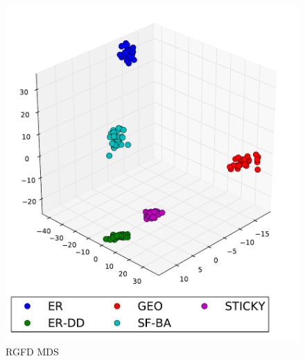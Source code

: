 \documentclass[11pt,xcolor=table]{beamer}
\begin{document}
\begin{frame}
\begin{figure}[H]
\begin{minipage}[b]{0.50\linewidth}
    \includegraphics[scale=0.30]
    {../code/final_results/trade_2010_thresholded/eval_results/rgfd_mds.pdf}
    \caption[Clustering Coefficient MDS]{RGFD MDS}
    \label{fig:clust_coeff_mds}
  \end{minipage} 
\label{fig:gcv_clust_mds} 
\end{figure}
  
  
\end{frame}
\end{document}
